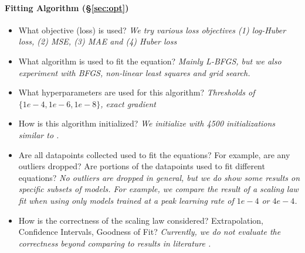 {\begin{minipage}[!ht]{38em}
\begin{minipage}[!ht]{0.9\textwidth}
\paragraph{Fitting Algorithm (\S\ref{sec:opt})}
\begin{itemize}[leftmargin=*]
    \item What objective (loss) is used? \textit{We try various loss objectives (1) log-Huber loss, (2) MSE, (3) MAE and (4) Huber loss}
    \item What algorithm is used to fit the equation? \textit{Mainly L-BFGS, but we also experiment with BFGS, non-linear least squares and grid search.}
    \item What hyperparameters are used for this algorithm? \textit{Thresholds of $\{1e-4, 1e-6, 1e-8\}$, exact gradient }
    \item How is this algorithm initialized? \textit{We initialize with 4500 initializations similar to \citet{hoffmann2022training}.}
    \item Are all datapoints collected used to fit the equations? For example, are any outliers dropped? Are portions of the datapoints used to fit different equations? \textit{No outliers are dropped in general, but we do show some results on specific subsets of models. For example, we compare the result of a scaling law fit when using only models trained at a peak learning rate of $1e-4$ or $4e-4$.}
    \item How is the correctness of the scaling law considered? Extrapolation, Confidence Intervals, Goodness of Fit? \textit{Currently, we do not evaluate the correctness beyond comparing to results in literature \citep{hoffmann2022training,kaplan2020scaling}.}
\end{itemize}

\end{minipage}


\end{minipage}}